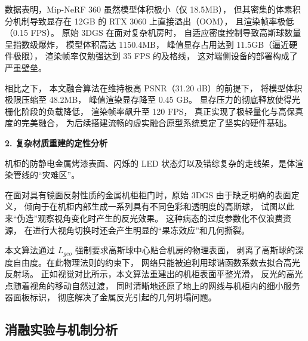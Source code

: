 数据表明，Mip-NeRF 360 虽然模型体积极小（仅 18.5MB），
但其密集的体素积分机制导致显存在 12GB 的 RTX 3060 上直接溢出（OOM），
且渲染帧率极低（0.15 FPS）。
原始 3DGS 在面对复杂机房时，
自适应密度控制导致高斯球数量呈指数级爆炸，
模型体积高达 1150.4MB，
峰值显存占用达到 11.5GB（逼近硬件极限），
渲染帧率仅勉强达到 35 FPS 的及格线，
这对端侧设备的部署构成了严重壁垒。

相比之下，
本文融合算法在维持极高 PSNR（31.20 dB）的前提下，
将模型体积极限压缩至 48.2MB，
峰值渲染显存降至 0.45 GB。
显存压力的彻底释放使得光栅化阶段的负载降低，
渲染帧率飙升至 120 FPS，
真正实现了极轻量化与高保真度的完美融合，
为后续搭建流畅的虚实融合原型系统奠定了坚实的硬件基础。

\textbf{2. 复杂材质重建的定性分析}

机柜的防静电金属烤漆表面、闪烁的 LED 状态灯以及错综复杂的走线架，是体渲染管线的“灾难区”。

在面对具有镜面反射性质的金属机柜柜门时，原始 3DGS 由于缺乏明确的表面定义，
倾向于在机柜内部生成一系列具有不同色彩和透明度的高斯球，
试图以此来“伪造”观察视角变化时产生的反光效果。
这种病态的过度参数化不仅浪费资源，
在进行大视角切换时还会产生明显的“果冻效应”和几何撕裂。

    
    

本文算法通过 $L_{geo}$ 强制要求高斯球中心贴合机房的物理表面，
剥离了高斯球的深度自由度。在此物理法则的约束下，
网络只能被迫利用球谐函数系数去拟合高光反射场。
正如视觉对比所示，本文算法重建出的机柜表面平整光滑，
反光的高光点随着视角的移动自然过渡，
同时清晰地还原了地上的网线与机柜内的细小服务器面板标识，
彻底解决了金属反光引起的几何坍塌问题。

\subsection{消融实验与机制分析}
\label{ch5_subsec:ablation_study}

